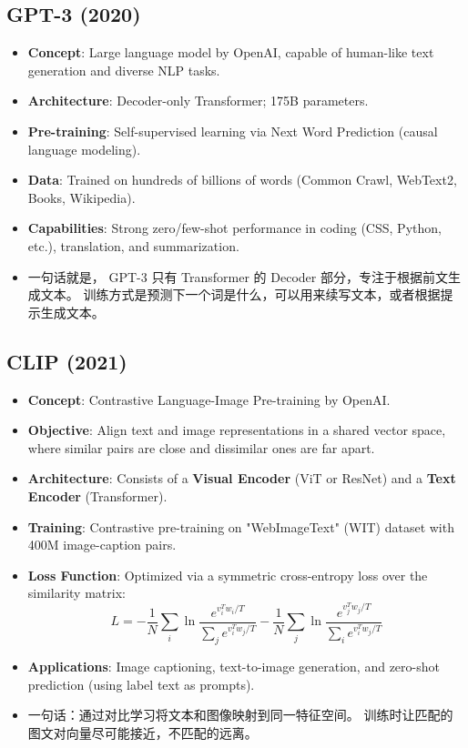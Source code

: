 \documentclass[UTF8]{ctexart}
\begin{document}
\subsection{GPT-3 (2020)}
\begin{itemize}
    \item \textbf{Concept}: Large language model by OpenAI, capable of human-like text generation and diverse NLP tasks.
    \item \textbf{Architecture}: Decoder-only Transformer; 175B parameters.
    \item \textbf{Pre-training}: Self-supervised learning via Next Word Prediction (causal language modeling).
    \item \textbf{Data}: Trained on hundreds of billions of words (Common Crawl, WebText2, Books, Wikipedia).
    \item \textbf{Capabilities}: Strong zero/few-shot performance in coding (CSS, Python, etc.), translation, and summarization.
    \item 一句话就是， GPT-3 只有 Transformer 的 Decoder 部分，专注于根据前文生成文本。
    训练方式是预测下一个词是什么，可以用来续写文本，或者根据提示生成文本。
\end{itemize}

\subsection{CLIP (2021)}
\begin{itemize}
    \item \textbf{Concept}: Contrastive Language-Image Pre-training by OpenAI.
    \item \textbf{Objective}: Align text and image representations in a shared vector space, where similar pairs are close and dissimilar ones are far apart.
    \item \textbf{Architecture}: Consists of a \textbf{Visual Encoder} (ViT or ResNet) and a \textbf{Text Encoder} (Transformer).
    \item \textbf{Training}: Contrastive pre-training on "WebImageText" (WIT) dataset with 400M image-caption pairs.
    \item \textbf{Loss Function}: Optimized via a symmetric cross-entropy loss over the similarity matrix:
    \[ L = -\frac{1}{N} \sum_{i} \ln \frac{e^{v_i^T w_i / T}}{\sum_{j} e^{v_i^T w_j / T}} - \frac{1}{N} \sum_{j} \ln \frac{e^{v_j^T w_j / T}}{\sum_{i} e^{v_i^T w_j / T}} \]
    \item \textbf{Applications}: Image captioning, text-to-image generation, and zero-shot prediction (using label text as prompts).
    \item 一句话：通过对比学习将文本和图像映射到同一特征空间。
    训练时让匹配的图文对向量尽可能接近，不匹配的远离。
\end{itemize}
\end{document}

